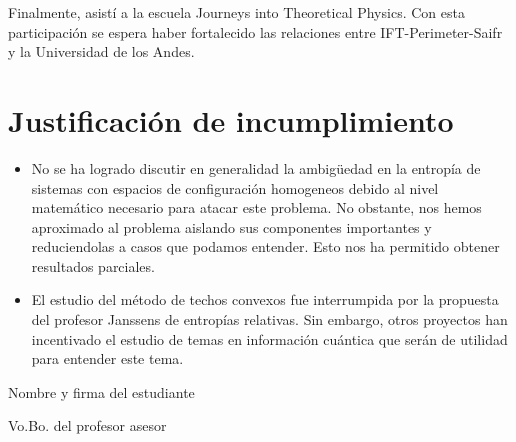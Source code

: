\documentclass{article}
\begin{document}
Finalmente, asistí a la escuela Journeys into Theoretical Physics. Con esta participación se espera haber fortalecido las relaciones entre IFT-Perimeter-Saifr y la Universidad de los Andes.


\section{Justificación de incumplimiento}

\begin{itemize}

\item No se ha logrado discutir en generalidad la ambigüedad en la entropía de sistemas con espacios de configuración homogeneos debido al nivel matemático necesario para atacar este problema. No obstante, nos hemos aproximado al problema aislando sus componentes importantes y reduciendolas a casos que podamos entender. Esto nos ha permitido obtener resultados parciales.

\item El estudio del método de techos convexos fue interrumpida por la propuesta del profesor Janssens de entropías relativas. Sin embargo, otros proyectos han incentivado el estudio de temas en información cuántica que serán de utilidad para entender este tema.

\end{itemize}

\vspace{1.5cm}
Nombre y firma del estudiante

\vspace{1.5cm}
Vo.Bo. del profesor asesor



\end{document}
